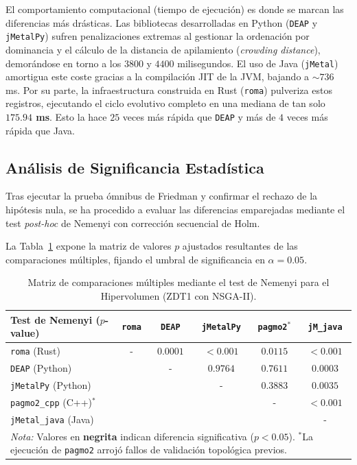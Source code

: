 \documentclass[12pt,a4paper,twoside,openright]{book}
\begin{document}
    El comportamiento computacional (tiempo de ejecución) es donde se marcan las diferencias más drásticas. Las bibliotecas desarrolladas en Python (\texttt{DEAP} y \texttt{jMetalPy}) sufren penalizaciones extremas al gestionar la ordenación por dominancia y el cálculo de la distancia de apilamiento (\textit{crowding distance}), demorándose en torno a los $3800$ y $4400$ milisegundos. El uso de Java (\texttt{jMetal}) amortigua este coste gracias a la compilación JIT de la JVM, bajando a $\sim736$ ms. Por su parte, la infraestructura construida en Rust (\texttt{roma}) pulveriza estos registros, ejecutando el ciclo evolutivo completo en una mediana de tan solo \textbf{$175.94$ ms}. Esto la hace $25$ veces más rápida que \texttt{DEAP} y más de $4$ veces más rápida que Java.

\subsection{Análisis de Significancia Estadística}

    Tras ejecutar la prueba ómnibus de Friedman y confirmar el rechazo de la hipótesis nula, se ha procedido a evaluar las diferencias emparejadas mediante el test \textit{post-hoc} de Nemenyi con corrección secuencial de Holm. 
    
    La Tabla~\ref{tab:nemenyi_zdt1} expone la matriz de valores $p$ ajustados resultantes de las comparaciones múltiples, fijando el umbral de significancia en $\alpha = 0.05$.

\begin{table}[htbp]
\centering
\small
\setlength{\tabcolsep}{4pt}
\begin{tabular}{l ccccc}
\toprule
\textbf{Test de Nemenyi ($p$-value)} & \texttt{roma} & \texttt{DEAP} & \texttt{jMetalPy} & \texttt{pagmo2$^*$} & \texttt{jM\_java} \\
\midrule
\texttt{roma} (Rust)         & - & $\mathbf{0.0001}$ & $\mathbf{< 0.001}$ & $\mathbf{0.0115}$ & $\mathbf{< 0.001}$ \\
\texttt{DEAP} (Python)        & & - & $0.9764$ & $0.7611$ & $\mathbf{0.0003}$ \\
\texttt{jMetalPy} (Python)    & & & - & $0.3883$ & $\mathbf{0.0035}$ \\
\texttt{pagmo2\_cpp} (C++)$^*$& & & & - & $\mathbf{< 0.001}$ \\
\texttt{jMetal\_java} (Java)  & & & & & - \\
\bottomrule
\multicolumn{6}{p{0.9\textwidth}}{\scriptsize \textit{Nota:} Valores en \textbf{negrita} indican diferencia significativa ($p < 0.05$). $^*$La ejecución de \texttt{pagmo2} arrojó fallos de validación topológica previos.}
\end{tabular}
\caption{Matriz de comparaciones múltiples mediante el test de Nemenyi para el Hipervolumen (ZDT1 con NSGA-II).}
\label{tab:nemenyi_zdt1}
\end{table}
\end{document}
